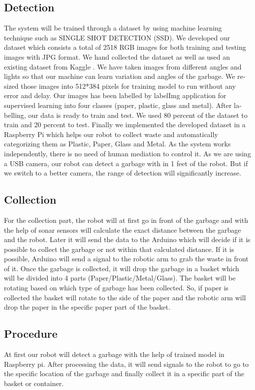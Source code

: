 \documentclass[conference]{IEEEtran}
\begin{document}
	\subsection{Detection}\label{AA}
	The system will be trained through a dataset by using machine learning technique such as SINGLE SHOT DETECTION (SSD). We developed our dataset which consists a total of 2518 RGB images for both training and testing images with JPG format. We hand collected the dataset as well as used an existing dataset from Kaggle \cite{b5}. We have taken images from different angles and lights so that our machine can learn variation and angles of the garbage. We re-sized those images into 512*384 pixels for training model to run without any error and delay. Our images has been labelled by labelImg application for supervised learning into four classes (paper, plastic, glass and metal). After la-belling, our data is ready to train and test. We used 80 percent of the dataset to train and 20 percent to test. Finally we implemented the developed dataset in a Raspberry Pi which helps our robot to collect waste and automatically categorizing them as Plastic, Paper, Glass and Metal. As the system works independently, there is no need of human mediation to control it. As we are using a USB camera, our robot can detect a garbage with in 1 feet of the robot. But if we switch to a better camera, the range of detection will significantly increase.
	\subsection{Collection}
	For the collection part, the robot will at first go in front of the garbage and with the help of sonar sensors will calculate the exact distance between the garbage and the robot. Later it will send the data to the Arduino which will decide if it is possible to collect the garbage or not within that calculated distance. If it is possible, Arduino will send a signal to the robotic arm to grab the waste in front of it. Once the garbage is collected, it will drop the garbage in a basket which will be divided into 4 parts (Paper/Plastic/Metal/Glass). The basket will be rotating based on which type of garbage has been collected. So, if paper is collected the basket will rotate to the side of the paper and the robotic arm will drop the paper in the specific paper part of the basket.
	
	\subsection{Procedure}
	At first our robot will detect a garbage with the help of trained model in Raspberry pi. After processing the data, it will send signals to the robot to go to the specific location of the garbage and finally collect it in a specific part of the basket or container.
	
\end{document}

